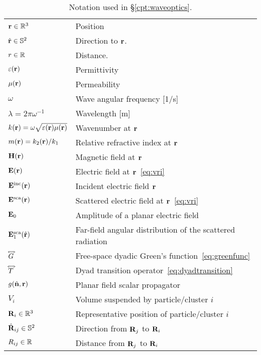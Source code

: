 \begin{table}[!ht]
	\centering
    \caption[Notation used in \S\ref{cpt:waveoptics}]{\label{tab:waveoptics:notation}
    	Notation used in \S\ref{cpt:waveoptics}.
    }
	\renewcommand{\arraystretch}{1.2}
    \begin{tabular}{ll}
        $\mathbf{r}\in\mathbb{R}^3$ & Position \\
        $\hat{\mathbf{r}}\in\mathbb{S}^2$ & Direction to $\mathbf{r}$. \\
        $r\in\mathbb{R}$ & Distance. \\
        \hline
        $\varepsilon(\mathbf{r})$ & Permittivity \\
        $\mu(\mathbf{r})$ & Permeability \\
        $\omega$ & Wave angular frequency [1/s] \\
        $\lambda=2\pi\omega^{-1}$ & Wavelength [m] \\
        $k(\mathbf{r})=\omega\sqrt{\varepsilon(\mathbf{r})\mu(\mathbf{r})}$ & Wavenumber at $\mathbf{r}$\\
        $m(\mathbf{r})=k_2(\mathbf{r})/k_1$ & Relative refractive index at $\mathbf{r}$ \\
        \hline
        $\mathbf{H}(\mathbf{r})$ & Magnetic field at $\mathbf{r}$ \\
        $\mathbf{E}(\mathbf{r})$   & Electric field at $\mathbf{r}$~\eqref{eq:vri}  \\
        $\mathbf{E}^\mathrm{inc}(\mathbf{r})$ & Incident electric field $\mathbf{r}$\\
        $\mathbf{E}^\mathrm{sca}(\mathbf{r})$ & Scattered electric field at $\mathbf{r}$~\eqref{eq:vri}\\ 
        $\mathbf{E}_0$ & Amplitude of a planar electric field \\
        $\mathbf{E}^\mathrm{sca}_1(\hat{\mathbf{r}})$ & Far-field angular distribution of the scattered radiation  \\
        \hline
        ${\accentset{\Longleftrightarrow}{G}}$ & Free-space dyadic Green's function~\eqref{eq:greenfunc} \\
        ${\accentset{\Longleftrightarrow}{T}}$ & Dyad transition operator~\eqref{eq:dyadtransition}\\
        $g(\hat{\mathbf{n}},\mathbf{r})$ & Planar field scalar propagator \\
        \hline
        \hline
        $V_i$ & Volume suspended by particle/cluster $i$ \\
        $\mathbf{R}_i\in\mathbb{R}^3$ & Representative position of particle/cluster $i$ \\
        $\hat{\mathbf{R}}_{ij}\in\mathbb{S}^2$ & Direction from $\mathbf{R}_j$ to $\mathbf{R}_i$\\
        $R_{ij}\in\mathbb{R}$ & Distance from $\mathbf{R}_j$ to $\mathbf{R}_i$\\

\end{tabular}
\end{table}
